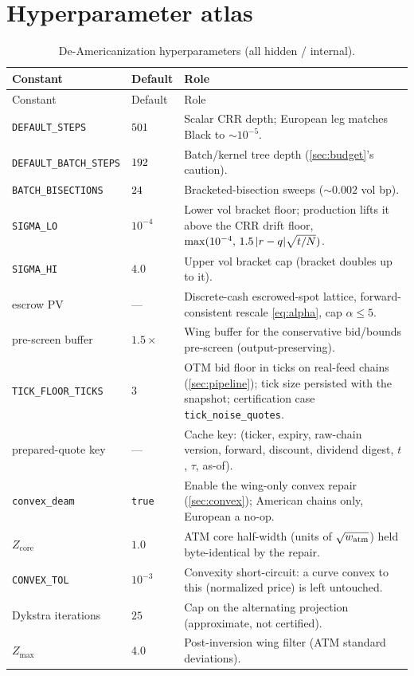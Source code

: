 \documentclass[11pt]{article}
\begin{document}
\appendix
\section{Hyperparameter atlas}
\label{app:atlas}

\begin{longtable}{p{}p{}p{}}
\caption{De-Americanization hyperparameters (all hidden / internal).}\label{tab:atlas}\\
\toprule Constant & Default & Role\\ \midrule
\endfirsthead \toprule Constant & Default & Role\\ \midrule \endhead
\texttt{DEFAULT\_STEPS} & $501$ & Scalar CRR depth; European
leg matches Black to $\sim10^{-5}$.\\
\texttt{DEFAULT\_BATCH\_STEPS} & $192$ & Batch/kernel tree depth
(\cref{sec:budget}'s caution).\\
\texttt{BATCH\_BISECTIONS} & $24$ & Bracketed-bisection sweeps
($\sim0.002$ vol bp).\\
\texttt{SIGMA\_LO} & $10^{-4}$ & Lower vol bracket floor; production lifts
it above the CRR drift floor,
$\max(10^{-4},\,1.5\,\lvert r-q\rvert\sqrt{t/N})$.\\
\texttt{SIGMA\_HI} & $4.0$ & Upper vol bracket cap (bracket doubles up to
it).\\
escrow PV & --- & Discrete-cash escrowed-spot lattice, forward-consistent
rescale \cref{eq:alpha}, cap $\alpha\le5$.\\
pre-screen buffer & $1.5\times$ & Wing buffer for the conservative
bid/bounds pre-screen (output-preserving).\\
\texttt{TICK\_FLOOR\_TICKS} & $3$ & OTM bid floor in ticks on real-feed
chains (\cref{sec:pipeline}); tick size persisted with the snapshot;
certification case \texttt{tick\_noise\_quotes}.\\
prepared-quote key & --- & Cache key: (ticker, expiry, raw-chain
version, forward, discount, dividend digest, $t$, $\tau$, as-of).\\
\texttt{convex\_deam} & \texttt{true} & Enable the wing-only convex
repair (\cref{sec:convex}); American chains only, European a no-op.\\
$Z_{\text{core}}$ & $1.0$ & ATM core half-width (units of
$\sqrt{w_{\mathrm{atm}}}$) held byte-identical by the repair.\\
\texttt{CONVEX\_TOL} & $10^{-3}$ & Convexity short-circuit: a curve convex
to this (normalized price) is left untouched.\\
Dykstra iterations & $25$ & Cap on the alternating projection
(approximate, not certified).\\
$Z_{\max}$ & $4.0$ & Post-inversion wing filter (ATM standard
deviations).\\
\bottomrule
\end{longtable}
\end{document}
